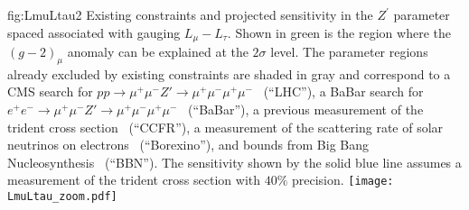 \begin{dunefigure}
{fig:LmuLtau2}
{Existing constraints and projected  sensitivity in the $Z^\prime$ parameter spaced associated with gauging $L_\mu - L_\tau$. Shown in green is the region where the $(g-2)_\mu$ anomaly can be explained at the $2\sigma$ level. The parameter regions already excluded by existing constraints are shaded in gray and correspond to 
a CMS search for $pp \to \mu^+\mu^- Z' \to \mu^+\mu^-\mu^+\mu^-$~\cite{Sirunyan:2018nnz} (``LHC''), 
a BaBar search for $e^+e^- \to \mu^+\mu^- Z' \to \mu^+\mu^-\mu^+\mu^-$~\cite{TheBABAR:2016rlg} (``BaBar''), 
a previous measurement of the trident cross section~\cite{Mishra:1991bv,Altmannshofer:2014pba} (``CCFR''), 
a measurement of the scattering rate of solar neutrinos on electrons~\cite{Bellini:2011rx,Harnik:2012ni,Agostini:2017ixy} (``Borexino''), 
and bounds from Big Bang Nucleosynthesis~\cite{Ahlgren:2013wba,Kamada:2015era} (``BBN''). The  sensitivity shown by the solid blue line assumes a measurement of the trident cross section with $40\%$ precision.}
\texttt{[image: LmuLtau\_zoom.pdf]}
\end{dunefigure}

